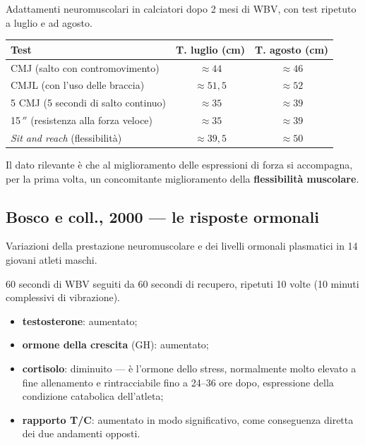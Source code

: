 Adattamenti neuromuscolari in calciatori dopo 2 mesi di WBV, con test ripetuto a luglio e ad agosto.

\begin{table}[htbp]
  \centering
  \small
  \renewcommand{\arraystretch}{1.3}
  \begin{tabularx}{\textwidth}{|X|c|c|}
    \hline
    \textbf{Test} & \textbf{T. luglio (cm)} & \textbf{T. agosto (cm)} \\
    \hline
    CMJ (salto con contromovimento) & $\approx 44$ & $\approx 46$ \\
    \hline
    CMJL (con l'uso delle braccia) & $\approx 51{,}5$ & $\approx 52$ \\
    \hline
    5 CMJ (5 secondi di salto continuo) & $\approx 35$ & $\approx 39$ \\
    \hline
    15\,$''$ (resistenza alla forza veloce) & $\approx 35$ & $\approx 39$ \\
    \hline
    \textit{Sit and reach} (flessibilità) & $\approx 39{,}5$ & $\approx 50$ \\
    \hline
  \end{tabularx}
\end{table}

Il dato rilevante è che al miglioramento delle espressioni di forza si accompagna, per la prima
volta, un concomitante miglioramento della \textbf{flessibilità muscolare}.

\subsection{Bosco e coll., 2000 --- le risposte ormonali}

Variazioni della prestazione neuromuscolare e dei livelli ormonali plasmatici in 14 giovani atleti
maschi.

60 secondi di WBV seguiti da 60 secondi di recupero, ripetuti 10 volte (10 minuti complessivi di
vibrazione).

\begin{itemize}
  \item \textbf{testosterone}: aumentato;
  \item \textbf{ormone della crescita} (GH): aumentato;
  \item \textbf{cortisolo}: diminuito --- è l'ormone dello stress, normalmente molto elevato a fine
    allenamento e rintracciabile fino a 24--36 ore dopo, espressione della condizione catabolica
    dell'atleta;
  \item \textbf{rapporto T/C}: aumentato in modo significativo, come conseguenza diretta dei due
    andamenti opposti.
\end{itemize}

